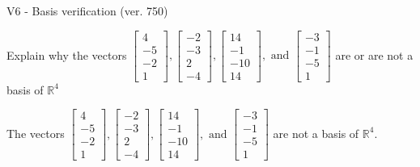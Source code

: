 \begin{exercise}
  \begin{exerciseTitle}V6 - Basis verification (ver. 750)\end{exerciseTitle}
  \begin{exerciseStatement}
    Explain why the vectors \(\left[\begin{array}{r}
4 \\
-5 \\
-2 \\
1
\end{array}\right] , \left[\begin{array}{r}
-2 \\
-3 \\
2 \\
-4
\end{array}\right] , \left[\begin{array}{r}
14 \\
-1 \\
-10 \\
14
\end{array}\right] , \text{ and } \left[\begin{array}{r}
-3 \\
-1 \\
-5 \\
1
\end{array}\right]\) are or are not a basis of \(\mathbb{R}^4\)	


  \end{exerciseStatement}
  \begin{exerciseAnswer}
   The vectors \(\left[\begin{array}{r}
4 \\
-5 \\
-2 \\
1
\end{array}\right] , \left[\begin{array}{r}
-2 \\
-3 \\
2 \\
-4
\end{array}\right] , \left[\begin{array}{r}
14 \\
-1 \\
-10 \\
14
\end{array}\right] , \text{ and } \left[\begin{array}{r}
-3 \\
-1 \\
-5 \\
1
\end{array}\right]\) 
  	 are not  a basis of \(\mathbb{R}^4\).
  


  \end{exerciseAnswer}
\end{exercise}
